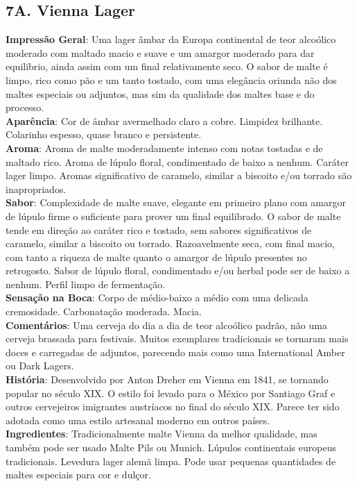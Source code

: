 \subsection*{7A. Vienna Lager}
\textbf{Impressão Geral}: Uma lager âmbar da Europa continental de teor alcoólico moderado com maltado macio e suave e um amargor moderado para dar equilibrio, ainda assim com um final relativamente seco. O sabor de malte é limpo, rico como pão e um tanto tostado, com uma elegância oriunda não dos maltes especiais ou adjuntos, mas sim da qualidade dos maltes base e do processo. \\
\textbf{Aparência}: Cor de âmbar avermelhado claro a cobre. Limpidez brilhante. Colarinho espesso, quase branco e persistente. \\
\textbf{Aroma}: Aroma de malte moderadamente intenso com notas tostadas e de maltado rico. Aroma de lúpulo floral, condimentado de baixo a nenhum. Caráter lager limpo. Aromas significativo de caramelo, similar a biscoito e/ou torrado são inapropriados. \\
\textbf{Sabor}: Complexidade de malte suave, elegante em primeiro plano com amargor de lúpulo firme o suficiente para prover um final equilibrado. O sabor de malte tende em direção ao caráter rico e tostado, sem sabores significativos de caramelo, similar a biscoito ou torrado. Razoavelmente seca, com final macio, com tanto a riqueza de malte quanto o amargor de lúpulo presentes no retrogosto. Sabor de lúpulo floral, condimentado e/ou herbal pode ser de baixo a nenhum. Perfil limpo de fermentação. \\
\textbf{Sensação na Boca}: Corpo de médio-baixo a médio com uma delicada cremosidade. Carbonatação moderada. Macia. \\
\textbf{Comentários}: Uma cerveja do dia a dia de teor alcoólico padrão, não uma cerveja brassada para festivais. Muitos exemplares tradicionais se tornaram mais doces e carregadas de adjuntos, parecendo mais como uma International Amber ou Dark Lagers. \\
\textbf{História}: Desenvolvido por Anton Dreher em Vienna em 1841, se tornando popular no século XIX. O estilo foi levado para o México por Santiago Graf e outros cervejeiros imigrantes austríacos no final do século XIX. Parece ter sido adotada como uma estilo artesanal moderno em outros países. \\
\textbf{Ingredientes}: Tradicionalmente malte Vienna da melhor qualidade, mas também pode ser usado Malte Pils ou Munich. Lúpulos continentais europeus tradicionais. Levedura lager alemã limpa. Pode usar pequenas quantidades de maltes especiais para cor e dulçor. \\
